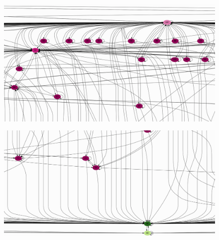 \begin{frame}[c]
\begin{figure}[htp]
\begin{center}
  \includegraphics[height=1\textheight]{graphics/pr_high_inout_degree.png}
\end{center}
\end{figure}

\end{frame}


\begin{frame}[c]
\begin{figure}[htp]
\begin{center}
  \includegraphics[height=1\textheight]{graphics/high_indegree.png}
\end{center}
\end{figure}
\end{frame}

